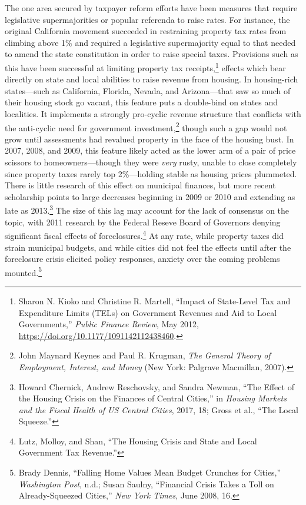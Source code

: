 \documentclass[12pt,oneside]{psthesis}
\begin{document}
The one area secured by taxpayer reform efforts have been measures that require legislative supermajorities or popular referenda to raise rates.
For instance, the original California movement succeeded in restraining property tax rates from climbing above 1\% and required a legislative supermajority equal to that needed to amend the state constitution in order to raise special taxes.
Provisions such as this have been successful at limiting property tax receipts,\footnote{Sharon N. Kioko and Christine R. Martell, ``Impact of State-Level Tax and Expenditure Limits (TELs) on Government Revenues and Aid to Local Governments,'' \emph{Public Finance Review}, May 2012, \url{https://doi.org/10.1177/1091142112438460}.} effects which bear directly on state and local abilities to raise revenue from housing.
In housing-rich states---such as California, Florida, Nevada, and Arizona---that saw so much of their housing stock go vacant, this feature puts a double-bind on states and localities.
It implements a strongly pro-cyclic revenue structure that conflicts with the anti-cyclic need for government investment,\footnote{John Maynard Keynes and Paul R. Krugman, \emph{The General Theory of Employment, Interest, and Money} (New York: Palgrave Macmillan, 2007).} though such a gap would not grow until assessments had revalued property in the face of the housing bust.
In 2007, 2008, and 2009, this feature likely acted as the lower arm of a pair of price scissors to homeowners---though they were \emph{very} rusty, unable to close completely since property taxes rarely top 2\%---holding stable as housing prices plummeted.
There is little research of this effect on municipal finances, but more recent scholarship points to large decreases beginning in 2009 or 2010 and extending as late as 2013.\footnote{Howard Chernick, Andrew Reschovsky, and Sandra Newman, ``The Effect of the Housing Crisis on the Finances of Central Cities,'' in \emph{Housing Markets and the Fiscal Health of US Central Cities}, 2017, 18; Gross et al., ``The Local Squeeze.''}
The size of this lag may account for the lack of consensus on the topic, with 2011 research by the Federal Reseve Board of Governors denying significant fiscal effects of foreclosures.\footnote{Lutz, Molloy, and Shan, ``The Housing Crisis and State and Local Government Tax Revenue.''}
At any rate, while property taxes did strain municipal budgets, and while cities did not feel the effects until after the foreclosure crisis elicited policy responses, anxiety over the coming problems mounted.\footnote{Brady Dennis, ``Falling Home Values Mean Budget Crunches for Cities,'' \emph{Washington Post}, n.d.; Susan Saulny, ``Financial Crisis Takes a Toll on Already-Squeezed Cities,'' \emph{New York Times}, June 2008, 16.}
\end{document}
